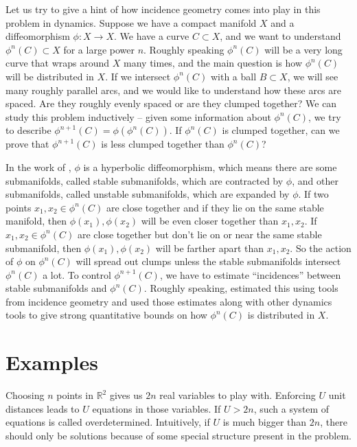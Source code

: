 \documentclass{amsart}
\newcommand{\RR}{\mathbb{R}}
\begin{document}
Let us try to give a hint of how incidence geometry comes into play in this problem in dynamics.   Suppose we have a compact manifold $X$ and a diffeomorphism $\phi: X \rightarrow X$.   We have a curve $C \subset X$,  and we want to understand $\phi^n(C) \subset X$ for a large power $n$.    Roughly speaking $\phi^n(C)$ will be a very long curve that wraps around $X$ many times,   and the main question is how $\phi^n(C)$ will be distributed in $X$.    If we intersect $\phi^n (C)$ with a ball $B \subset X$,  we will see many roughly parallel arcs,  and we would like to understand how these arcs are spaced.   Are they roughly evenly spaced or are they clumped together?  We can study this problem inductively -- given some information about $\phi^n(C)$,  we try to describe $\phi^{n+1}(C) = \phi ( \phi^n(C))$.   If $\phi^n(C)$ is clumped together, can we prove that $\phi^{n+1}(C)$ is less clumped together than $\phi^n(C)$?  

In the work of \cite{LM},  $\phi$ is a hyperbolic diffeomorphism,  which means there are some submanifolds,  called stable submanifolds,  which are contracted by $\phi$,  and other submanifolds,  called unstable submanifolds,  which are expanded by $\phi$.   If two points $x_1, x_2 \in \phi^n(C)$ are close together and if they lie on the same stable manifold,  then $\phi(x_1), \phi(x_2)$ will be even closer together than $x_1, x_2$.   If $x_1, x_2 \in \phi^n(C)$ are close together but don't lie on or near the same stable submanifold,  then $\phi(x_1), \phi(x_2)$ will be farther apart than $x_1, x_2$.    So the action of $\phi$ on $\phi^n(C)$ will spread out clumps unless the stable submanifolds intersect $\phi^n(C)$ a lot.  To control $\phi^{n+1}(C)$,  we have to estimate ``incidences'' between stable submanifolds and $\phi^n(C)$.   Roughly speaking,  \cite{LM} estimated this using tools from incidence geometry and used those estimates along with other dynamics tools to give strong quantitative bounds on how $\phi^n(C)$ is distributed in $X$.












\section{Examples} \label{secexamples}

Choosing $n$ points in $\RR^2$ gives us $2n$ real variables to play with.   Enforcing $U$ unit distances leads to $U$ equations in those variables.   If $U > 2n$,  such a system of equations is called overdetermined.   Intuitively,  if $U$ is much bigger than $2n$,  there should only be solutions because of some special structure present in the problem.  
\end{document}
